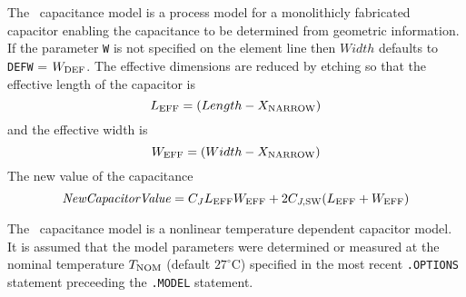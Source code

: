 \label{CAPmodelsp3}




The \spicethree\ capacitance model is a process model for a monolithicly
fabricated capacitor enabling the capacitance to be determined from geometric
information.  If the parameter {\tt W} is not specified on the element
line then $Width$
defaults to {\tt DEFW} = $W_{\mbox{\scriptsize DEF}}$. The effective dimensions are reduced
by etching so that the effective length of the capacitor is
\begin{equation}
L_{\mbox{\scriptsize EFF}} = (Length - X_{\mbox{\scriptsize NARROW}})
\end{equation}
and the effective width is
\begin{equation}
W_{\mbox{\scriptsize EFF}} = (Width - X_{\mbox{\scriptsize NARROW}})
\end{equation}
The new value of the capacitance
\begin{equation}
{\it NewCapacitorValue} = C_J L_{\mbox{\scriptsize EFF}} W_{\mbox{\scriptsize EFF}}
          + 2 C_{J,\mbox{\scriptsize SW}}( L_{\mbox{\scriptsize EFF}} +  W_{\mbox{\scriptsize EFF}} )
\end{equation}


\label{CAPmodelpspice}




The \pspice\ capacitance model is a nonlinear temperature dependent capacitor
model.  It is assumed that the model parameters were determined or
measured at the nominal temperature $T_{\mbox{\scriptsize NOM}}$ (default
$27^{\circ}$C) specified in the most recent {\tt .OPTIONS} statement
preceeding the {\tt .MODEL} statement.

